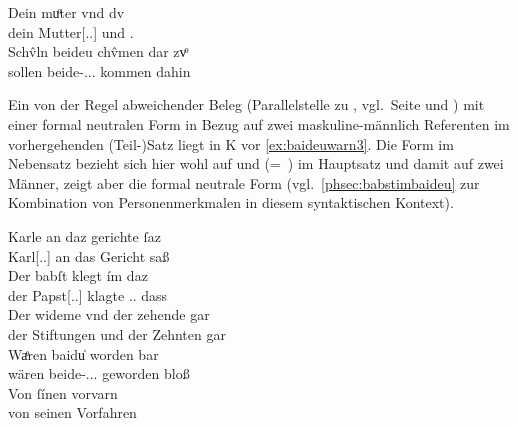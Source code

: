 \begin{exe}
\ex \label{ex:mutterdu2}
	\gll Dein muͦter vnd dv \\
		dein Mutter[\Nom.\Sg.\FemF] und \Ssg\subM.\Nom{} \\
\sn \gll Schv̂ln beideu chv̂men {dar zvͦ} \\
		sollen beide-\Nom.\Pl.\NeutMF.\St{} kommen dahin \\
	\begin{taggedline}{\parencites(3/1 Wortformen, gleicher Teilsatz)[\pno~23rc,13--14]{kc:B1}}
	\trans {}
	\end{taggedline}
\end{exe}

\label{phsec:baideuwarn3}
Ein von der Regel abweichender Beleg (Parallelstelle zu \cite[\pno~75rb,3--4]{kc:C1}, vgl.~Seite \pageref{phsec:babstimbaideu} und
\pageref{phsec:baideuwarn}) mit einer formal neutralen Form in Bezug auf zwei
maskuline-männlich Referenten im vorhergehenden (Teil-)Satz liegt in
K vor \cref{ex:baideuwarn3}. Die Form  im Nebensatz
bezieht sich hier wohl auf
  und   (=~) im
Hauptsatz und damit auf zwei Männer, zeigt aber die formal neutrale Form
(vgl.~\cref{phsec:babstimbaideu} zur Kombination von Personenmerkmalen in
diesem syntaktischen Kontext).

\begin{exe}
\ex \label{ex:baideuwarn3}
	\gll Karle an daz gerichte ſaz \\
	    Karl[\Nom.\Sg.\MascM] an das Gericht saß \\
\sn \gll Der babſt klegt ím daz \\
		der Papst[\Nom.\Sg.\MascM] klagte \Tsg.\MascM.\Dat{} dass \\
\sn \gll Der wideme vnd der zehende gar \\
		der Stiftungen und der Zehnten gar \\
\sn \gll Waͤren baidu̍ worden bar \\
		wären beide-\Nom.\Pl.\NeutM.\St{} geworden bloß \\
\sn \gll Von ſínen vorvarn \\
		von seinen Vorfahren \\
	\begin{taggedline}{\parencites[\pno~85vb,21--25]{kc:K}[vgl. abweichend][14382--14386]{schroeder1895}}
	\trans {}
	\end{taggedline}
\end{exe}

